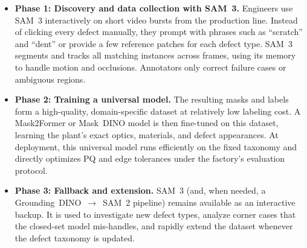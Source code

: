 \begin{enrichment}
	\begin{itemize}
		\item \textbf{Phase 1: Discovery and data collection with SAM~3.} Engineers use SAM~3 interactively on short video bursts from the production line. Instead of clicking every defect manually, they prompt with phrases such as ``scratch'' and ``dent'' or provide a few reference patches for each defect type. SAM~3 segments and tracks all matching instances across frames, using its memory to handle motion and occlusions. Annotators only correct failure cases or ambiguous regions.
		\item \textbf{Phase 2: Training a universal model.} The resulting masks and labels form a high-quality, domain-specific dataset at relatively low labeling cost. A Mask2Former or Mask~DINO model is then fine-tuned on this dataset, learning the plant’s exact optics, materials, and defect appearances. At deployment, this universal model runs efficiently on the fixed taxonomy and directly optimizes PQ and edge tolerances under the factory’s evaluation protocol.
		\item \textbf{Phase 3: Fallback and extension.} SAM~3 (and, when needed, a Grounding~DINO~$\to$~SAM~2 pipeline) remains available as an interactive backup. It is used to investigate new defect types, analyze corner cases that the closed-set model mis-handles, and rapidly extend the dataset whenever the defect taxonomy is updated.
	\end{itemize}
	
	\newpage
	
	\begin{enrichment}
		
		\label{enr:subsec_chapter15_sam}
		

\end{enrichment}
\end{enrichment}
